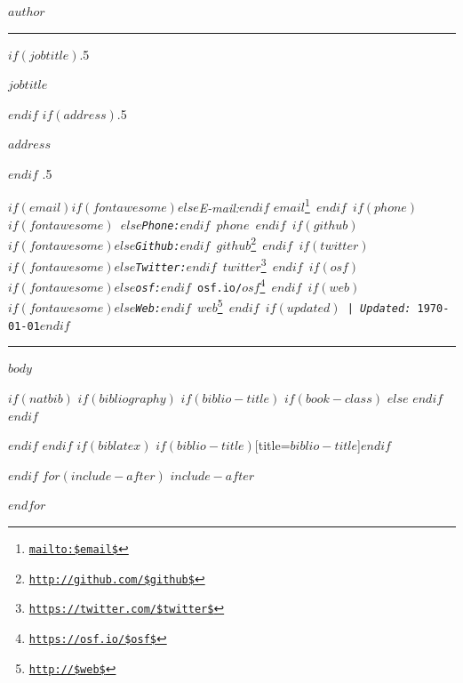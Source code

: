 \documentclass[$if(fontsize)$$fontsize$,$endif$$if(lang)$$babel-lang$,$endif$$if(papersize)$$papersize$paper,$endif$$for(classoption)$$classoption$$sep$,$endfor$]{$documentclass$}
\renewcommand{\href}[2]{#2\footnote{\url{#1}}}
\begin{document}
\centerline{\huge \bf $author$}

\vspace{2 mm}

\hrule

\vspace{2 mm}

$if(jobtitle)$\moveleft.5\hoffset\centerline{$jobtitle$}$endif$
$if(address)$\moveleft.5\hoffset\centerline{$address$}$endif$
\moveleft.5\hoffset\centerline{ $if(email)$$if(fontawesome)$\faEnvelopeO \hspace{1 mm}$else$\emph{E-mail:}$endif$ \href{mailto:$email$}{\tt $email$} \hspace{1 mm}$endif$ $if(phone)$$if(fontawesome)$ \faPhone \hspace{1 mm}$else$\emph{Phone:}$endif$  $phone$  \hspace{1 mm} $endif$ $if(github)$$if(fontawesome)$\faGithub \hspace{1 mm}$else$\emph{Github:}$endif$ \href{http://github.com/$github$}{\tt $github$} \hspace{1 mm} $endif$  $if(twitter)$$if(fontawesome)$\faTwitter \hspace{1 mm}$else$\emph{Twitter:}$endif$ \href{https://twitter.com/$twitter$}{\tt $twitter$} \hspace{1 mm} $endif$ $if(osf)$$if(fontawesome)$\faUnlock \hspace{1 mm}$else$\emph{osf:}$endif$ \href{https://osf.io/$osf$}{\tt osf.io/$osf$} \hspace{1 mm} $endif$ $if(web)$$if(fontawesome)$\faGlobe \hspace{1 mm}$else$\emph{Web:}$endif$ \href{http://$web$}{\tt $web$}  $endif$ $if(updated)$ | \emph{Updated:} \apstylekinda\today$endif$} 

\vspace{2 mm}

\hrule


$body$

$if(natbib)$
$if(bibliography)$
$if(biblio-title)$
$if(book-class)$
\renewcommand\bibname{$biblio-title$}
$else$
\renewcommand\refname{$biblio-title$}
$endif$
$endif$


$endif$
$endif$
$if(biblatex)$
\printbibliography$if(biblio-title)$[title=$biblio-title$]$endif$

$endif$
$for(include-after)$
$include-after$

$endfor$
\end{document}
